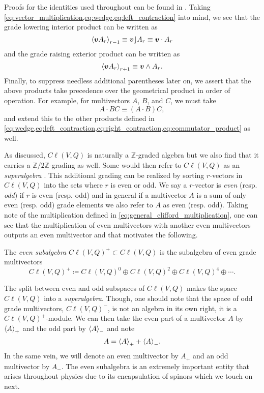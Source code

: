 Proofs for the identities used throughout can be found in \cite{chisolm_geometric_2012}.  Taking \cref{eq:vector_multiplication,eq:wedge,eq:left_contraction} into mind, we see that the grade lowering interior product can be written as
\begin{equation}
    \proj{r-1}{\blade{v}A_r} \equiv \blade{v}\rfloor A_r \equiv \blade{v} \cdot A_r
\end{equation}
and the grade raising exterior product can be written as
\begin{equation}
    \proj{r+1}{\blade{v}A_r} \equiv \blade{v} \wedge A_r.
\end{equation}
Finally, to suppress needless additional parentheses later on, we assert that the above products take precedence over the geometrical product in order of operation. For example, for multivectors $A$, $B$, and $C$, we must take
\begin{equation}
A\cdot B C \equiv (A \cdot B)C,
\end{equation}
and extend this to the other products defined in \cref{eq:wedge,eq:left_contraction,eq:right_contraction,eq:commutator_product} as well. 

As discussed, $C\ell(V,Q)$ is naturally a $\mathbb{Z}$-graded algebra but we also find that it carries a $\mathbb{Z}/2\mathbb{Z}$-grading as well. Some would then refer to $C\ell(V,Q)$ as an \emph{superalgebra} . This additional grading can be realized by sorting $r$-vectors in $C\ell(V,Q)$ into the sets where $r$ is even or odd.  We say a $r$-vector is \emph{even} (resp. \emph{odd}) if $r$ is even (resp. odd) and in general if a multivector $A$ is a sum of only even (resp. odd) grade elements we also refer to $A$ as even (resp. odd).  Taking note of the multiplication defined in \ref{eq:general_clifford_multiplication}, one can see that the multiplication of even multivectors with another even multivectors outputs an even multivector and that motivates the following.
\begin{definition}
The \emph{even subalgebra} $C\ell(V,Q)^+ \subset C\ell(V,Q)$ is the subalgebra of even grade multivectors
\begin{equation}
    C\ell(V,Q)^+ \coloneqq C\ell(V,Q)^0 \oplus C\ell(V,Q)^2 \oplus C\ell(V,Q)^4 \oplus \cdots.
\end{equation}
\end{definition}
The split between even and odd subspaces of $C\ell(V,Q)$ makes the space $C\ell(V,Q)$ into a \emph{superalgebra}. Though, one should note that the space of odd grade multivectors, $C\ell(V,Q)^-$, is not an algebra in its own right, it is a $C\ell(V,Q)^+$-module. We can then take the even part of a multivector $A$ by $\proj{+}{A}$ and the odd part by $\proj{-}{A}$ and note
\begin{equation}
A = \proj{+}{A} + \proj{-}{A}.
\end{equation}
In the same vein, we will denote an even multivector by $A_+$ and an odd multivector by $A_-$. The even subalgebra is an extremely important entity that arises throughout physics due to its encapsulation of spinors which we touch on next. 


